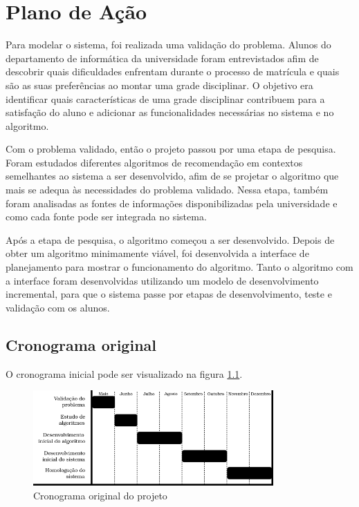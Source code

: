 
\chapter{Plano de Ação}
\label{cha:Plano de Ação}

Para modelar o sistema, foi realizada uma validação do problema. Alunos do departamento de informática da universidade foram entrevistados afim de descobrir quais dificuldades enfrentam durante o processo de matrícula e quais são as suas preferências ao montar uma grade disciplinar. O objetivo era identificar quais características de uma grade disciplinar contribuem para a satisfação do aluno e adicionar as funcionalidades necessárias no sistema e no algoritmo.

Com o problema validado, então o projeto passou por uma etapa de pesquisa. 
Foram estudados diferentes algoritmos de recomendação em contextos semelhantes ao sistema a ser desenvolvido, afim de se projetar o algoritmo que mais se adequa às necessidades do problema validado. 
Nessa etapa, também foram analisadas as fontes de informações disponibilizadas pela universidade e como cada fonte pode ser integrada no sistema. 

Após a etapa de pesquisa, o algoritmo começou a ser desenvolvido. 
Depois de obter um algoritmo minimamente viável, foi desenvolvida a interface de planejamento para mostrar o funcionamento do algoritmo. 
Tanto o algoritmo com a interface foram desenvolvidas utilizando um modelo de desenvolvimento incremental, para que o sistema passe por etapas de desenvolvimento, teste e validação com os alunos. 

\section{Cronograma original}

O cronograma inicial pode ser visualizado na figura \ref{fig-cronograma}.

\begin{figure}[ht!]
    \begin{center}
    \includegraphics[width=260pt]{figuras/cronograma}
    \caption{Cronograma original do projeto}
    \label{fig-cronograma}
    \end{center}
\end{figure}


